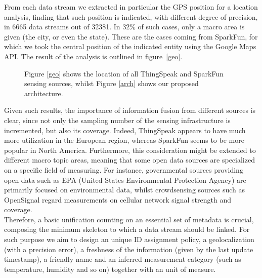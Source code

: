 From each data stream we extracted in particular the GPS position for a location analysis, finding that such position is indicated, with different degree of precision, in 6665 data streams out of 32381.
In 32\% of such cases, only a macro area is given (the city, or even the state).
These are the cases coming from SparkFun, for which we took the central position of the indicated entity using the Google Maps API.
The result of the analysis is outlined in figure~\ref{geo}.

\begin{figure}[!t]
\centering
{}
\caption{Figure \ref{geo} shows the location of all ThingSpeak and SparkFun sensing sources, whilst Figure \ref{arch} shows our proposed architecture.}
\end{figure}

Given such results, the importance of information fusion from different sources is clear, since not only the sampling number of the sensing infrastructure is incremented, but also its coverage.
Indeed, ThingSpeak appears to have much more utilization in the European region, whereas SparkFun seems to be more popular in North America.
Furthermore, this consideration might be extended to different macro topic areas, meaning that some open data sources are specialized on a specific field of measuring.
For instance, governmental sources providing open data such as EPA (United States Environmental Protection Agency) \cite{epa} are primarily focused on environmental data, whilst crowdsensing sources such as OpenSignal \cite{opensignal} regard measurements on cellular network signal strength and coverage.
\\
Therefore, a basic unification counting on an essential set of metadata is crucial, composing the minimum skeleton to which a data stream should be linked.
For such purpose we aim to design an unique ID assignment policy, a geolocalization (with a precision error), a freshness of the information (given by the last update timestamp), a friendly name and an inferred measurement category (such as temperature, humidity and so on) together with an unit of measure.

